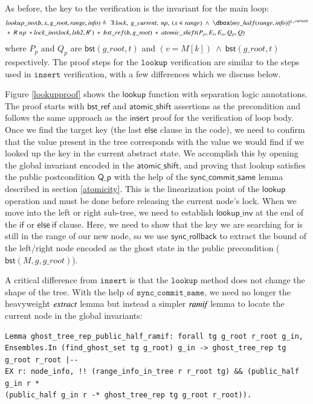 \documentclass[a4paper,USenglish,cleveref, autoref, thm-restate]{lipics-v2021}
\newcommand\dboxed[1]{\dbox{\ensuremath{#1}}}
\newcommand{\ghost}[2]{\ensuremath{\dboxed{#1}^{#2}}}
\newcommand{\treerep}{\ensuremath{\mathsf{bst}}}
\newcommand{\nodeboxrep}{\ensuremath{\mathsf{bst\_ref}}}
\begin{document}
As before, the key to the verification is the invariant for the main loop:
\begin{align*} &\mathsf{lookup\_inv}(b, x, \mathit{g\_root}, \mathit{range},\mathit{info}) \triangleq\ \exists\ \mathit{lock},\ \mathit{g\_current},\ \mathit{np},\ (x\in \mathit{range})\ \land \ \ghost{\mathsf{my\_half}(\mathit{range},\mathit{info})}{\mathit{g\_current}}\\& *\ R\ np\ * \mathsf{lock\_inv}(\mathit{lock},\mathit{lsh2},R')\ *\ \nodeboxrep(b,\mathit{g\_root})\ *\ \mathsf{atomic\_shift} (P_p,E_i,E_o,Q_p,Q) \end{align*}
where $P_p$ and $Q_p$ are $\treerep(g\_root, t)$ and $(v =
M[k])\ \wedge\ \treerep(g\_root, t)$ respectively. The proof steps for
the $\texttt{lookup}$ verification are similar to the steps
used in $\texttt{insert}$ verification, with a few differences which we
discuss below.

Figure \ref{lookupproof} shows the $\mathsf{lookup}$ function
with separation logic annotations. The proof starts with
$\nodeboxrep$ and $\mathsf{atomic\_shift}$ assertions as the
precondition and follows the same approach as the $\mathsf{insert}$
proof for the verification of loop body. Once we find the target key
(the last $\mathsf{else}$ clause in the code), we need
to confirm that the value present in the tree corresponds with the value we would find if we looked up the key in the current abstract state. We accomplish this by opening the global
invariant encoded in the $\mathsf{atomic\_shift}$, and proving that
lookup satisfies the public postcondition $\mathsf{Q\_p}$ with the help
of the $\mathsf{sync\_commit\_same}$ lemma described in section
\ref{atomicity}. This is the linearization point of the
$\mathsf{lookup}$ operation and must be done before releasing the
current node's lock. When we move into the left or right sub-tree,
we need to establish $\mathsf{lookup\_inv}$ at the end of the $\mathsf{if}$
or $\mathsf{else\ if}$ clause. Here, we need to show that the key we
are searching for is still in the range of our new node, so we use
$\mathsf{sync\_rollback}$ to extract the bound of the left/right
node encoded as the ghost state in the public precondition
($\treerep(M, g, g\_root)$).

A critical difference from $\texttt{insert}$ is that the
$\texttt{lookup}$ method does not change the shape of the tree. With the
help of $\texttt{sync\_commit\_same}$, we need no longer the
heavyweight $\emph{extract}$ lemma but instead a simpler
$\emph{ramif}$ lemma to locate the current node in the global
invariants:
\begin{verbatim}
Lemma ghost_tree_rep_public_half_ramif: forall tg g_root r_root g_in,
Ensembles.In (find_ghost_set tg g_root) g_in -> ghost_tree_rep tg g_root r_root |-- 
EX r: node_info, !! (range_info_in_tree r r_root tg) && (public_half g_in r * 
(public_half g_in r -* ghost_tree_rep tg g_root r_root)).
\end{verbatim}
\end{document}
